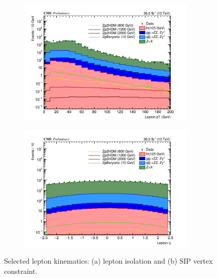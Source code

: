  
\begin{figure}[tbh]
\begin{subfigure}{0.50\textwidth}
\centering
\includegraphics[width=3.3in]{figures/hist_hPtLep_3.png}
\caption{}
\end{subfigure}
\begin{subfigure}{0.50\textwidth}
\centering
\includegraphics[width=3.3in]{figures/hist_hEtaLep_3.png}
\caption{}
\end{subfigure}
\caption{Selected lepton kinematics: (a) lepton isolation and (b) SIP vertex constraint.}
\label{fig:lepkin1}
\end{figure}
 
